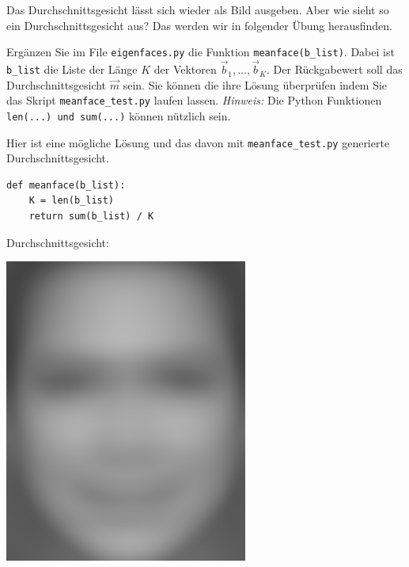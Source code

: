 Das Durchschnittsgesicht lässt sich wieder als Bild ausgeben.
Aber wie sieht so ein Durchschnittsgesicht aus?
Das werden wir in folgender Übung herausfinden.
\begin{aufgabe}
	Ergänzen Sie im File \texttt{eigenfaces.py} die Funktion \texttt{meanface(b\_list)}.
	Dabei ist \texttt{b\_list} die Liste der Länge $K$ der Vektoren $\vec b_1,\ldots,\vec b_K$.
	Der Rückgabewert soll das Durchschnittsgesicht $\vec m$ sein.
	Sie können die ihre Lösung überprüfen indem Sie das Skript \texttt{meanface\_test.py} laufen lassen.
	\textit{Hinweis:} Die Python Funktionen \texttt{len(...) und sum(...)} können nützlich sein.
\end{aufgabe}
\begin{losung*}
	Hier ist eine mögliche Lösung und das davon mit \texttt{meanface\_test.py} generierte Durchschnittsgesicht.\\[0.5cm]
	\begin{minipage}{0.45\textwidth}
\begin{lstlisting}[style=python]
def meanface(b_list):
	K = len(b_list)
	return sum(b_list) / K
\end{lstlisting}
	\end{minipage}\hfill
	\begin{minipage}{0.3\textwidth}\vspace{-1cm}
		\centering\hfill Durchschnittsgesicht:
	\end{minipage}
	\begin{minipage}{0.2\textwidth}\vspace{-1cm}
		\centering\includegraphics[width=0.6\textwidth]{images/facespace/meanface}
	\end{minipage}
\end{losung*}
